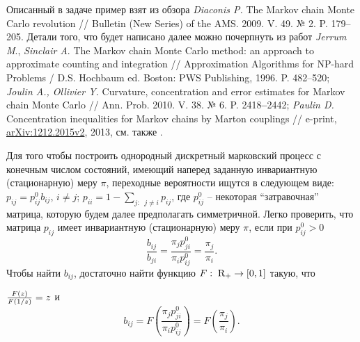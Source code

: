 \begin{ordre}
Описанный в задаче пример взят из обзора \textit{Diaconis P.} The Markov 
chain Monte Carlo revolution // Bulletin (New Series) of the AMS. 2009. V. 
49. № 2. P. 179--205. Детали того, что будет написано далее можно почерпнуть 
из работ \textit{Jerrum M}., \textit{Sinclair A}. The Markov chain Monte Carlo method: an approach to 
approximate counting and integration // Approximation Algorithms for NP-hard 
Problems / D.S. Hochbaum ed. Boston: PWS Publishing, 1996. P. 482--520; \textit{Joulin A., Ollivier Y.} Curvature, concentration and 
error estimates for Markov chain Monte Carlo // Ann. Prob. 2010. V. 38. № 6. 
P. 2418\textbf{--}2442; \textit{Paulin D.} Concentration inequalities for Markov chains by 
Marton couplings // e-print, \underline {arXiv:1212.2015v2}, 2013, см. также \cite{240}.

Для того чтобы построить однородный дискретный марковский процесс с конечным 
числом состояний, имеющий наперед заданную инвариантную (стационарную) меру 
$\pi $, переходные вероятности ищутся в следующем виде: $p_{ij} =p_{ij}^0 
b_{ij} $, $i\ne j$; $p_{ii} =1-\sum\limits_{j:\;\;j\ne i} {p_{ij} } $, где 
$p_{ij}^0 $ -- некоторая ``затравочная'' матрица, которую будем далее 
предполагать симметричной. Легко проверить, что матрица $p_{ij} $ имеет 
инвариантную (стационарную) меру $\pi $, если при $p_{ij}^0 >0$
\[
\frac{b_{ij} }{b_{ji} }=\frac{\pi _j p_{ji}^0 }{\pi _i p_{ij}^0 }=\frac{\pi 
_j }{\pi _i }.
\]
Чтобы найти $b_{ij} $, достаточно найти функцию $F:\;{\rm R}_+ \to \left[ 
{0,1} \right]$ такую, что

$\frac{F\left( z \right)}{F\left( {1 \mathord{\left/ {\vphantom {1 z}} 
\right. \kern-\nulldelimiterspace} z} \right)}=z$ и $$b_{ij} =F\left( 
{\frac{\pi _j p_{ji}^0 }{\pi _i p_{ij}^0 }} \right)=F\left( {\frac{\pi _j 
}{\pi _i }} \right).$$


\end{ordre}
